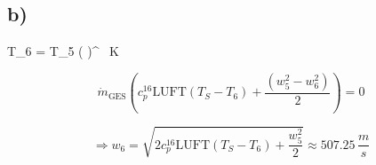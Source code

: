 

\subsection*{b)}

 \quad T_6 = T_5 \left(  \right)^{}  \, K



\[
\dot{m}_{\text{GES}} \left( c_p^{16} \text{LUFT} \left( T_S - T_6 \right) + \frac{(w_5^2 - w_6^2)}{2} \right) = 0
\]

\[
\Rightarrow w_6 = \sqrt{2 c_p^{16} \text{LUFT} \left( T_S - T_6 \right) + \frac{w_5^2}{2}} \approx 507.25 \, \frac{m}{s}
\]